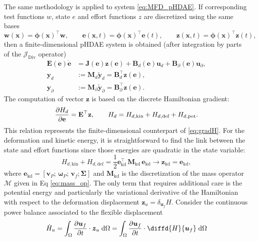 \documentclass{svjour3}                     %
\DeclareMathOperator*{\Div}{Div}
\begin{document}
The same methodology is applied to system \eqref{eq:MFD_pHDAE}. If corresponding test functions $w$, state $e$ and effort functions $z$ are discretized using the same bases
\[ \bm{w}(\bm{x}) = \bm{\phi}(\bm{x})^\top \mathbf{w}, \qquad \bm{e}(\bm{x}, t) = \bm{\phi}(\bm{x})^\top \mathbf{e}(t), \qquad \bm{z}(\bm{x}, t) = \bm{\phi}(\bm{x})^\top \mathbf{z}(t),
\]
then a finite-dimensional pHDAE system is obtained (after integration by parts of the $\mathcal{J}_{\Div}$ operator)
\begin{equation}
\begin{aligned}
\mathbf{E}(\mathbf{e}) \dot{\mathbf{e}} &= \mathbf{J}(\mathbf{e}) \mathbf{z}(\mathbf{e}) + \mathbf{B}_d(\mathbf{e}) \mathbf{u}_d + \mathbf{B}_\partial(\mathbf{e}) \mathbf{u}_\partial, \\
\mathbf{y}_d &:= \mathbf{M}_d \widetilde{\mathbf{y}}_d = \mathbf{B}_d^\top \mathbf{z}(\mathbf{e}),  \\
\mathbf{y}_\partial &:= \mathbf{M}_\partial \widetilde{\mathbf{y}}_\partial = \mathbf{B}_\partial^\top \mathbf{z}(\mathbf{e}).
\end{aligned}
\end{equation}
The computation of vector $\mathbf{z}$ is based on the discrete Hamiltonian  gradient:
\[
\diffp{H_d}{\mathbf{e}} = \mathbf{E}^\top \mathbf{z}, \qquad H_d = H_{d, \text{kin}}+H_{d, \text{def}}+H_{d, \text{pot}}.
\]
This relation represents the finite-dimensional counterpart of \eqref{eq:gradH}. For the deformation and kinetic energy, it is straightforward to find the link between the state and effort functions since those energies are quadratic in the state variable:
\begin{equation}
H_{d, \text{kin}} + H_{d, \text{def}} = \frac{1}{2} \mathbf{e}_{\text{kd}}^\top \, \mathbf{M}_{\text{kd}} \, \mathbf{e}_{\text{kd}} \longrightarrow \mathbf{z}_{\text{kd}} = \mathbf{e}_{\text{kd}},
\end{equation}
where $\mathbf{e}_{\text{kd}} = [\mathbf{v}_P; \, \bm{\omega}_P; \, \mathbf{v}_f; \bm{\Sigma}]$ and $\mathbf{M}_{\text{kd}}$ is the discretization of the mass operator $\bm{\mathcal{M}}$ given in Eq \eqref{eq:mass_op}.
The only term that requires additional care is the potential energy and particularly the variational derivative of the Hamiltonian with respect to the deformation displacement $\bm{z}_{u}=\delta_{\bm{u}_f} H$.  Consider the continuous power balance associated to the flexible displacement
\[
\dot{H}_u = \int_{\Omega} \diffp{\bm{u}_f}{t} \cdot \bm{z}_{u} \d{\Omega} = \int_{\Omega} \diffp{\bm{u}_f}{t} \cdot \diffd{H}{\bm{u}_f} \d{\Omega}
\]
\end{document}
